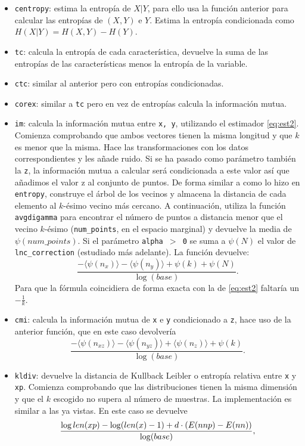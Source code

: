 \documentclass[12pt,a4paper]{report} %
\let\mathbb\relax
\theoremstyle{definition}
\begin{document}
\begin{itemize}
\item \texttt{centropy}: estima la entropía de $X|Y$, para ello usa la función anterior para calcular las entropías de $(X,Y)$ e $Y$. Estima la entropía condicionada como $H(X|Y) = H(X,Y)-H(Y)$.
\item \texttt{tc}: calcula la entropía de cada característica, devuelve la suma de las entropías de las características menos la entropía de la variable.
\item \texttt{ctc}: similar al anterior pero con entropías condicionadas.
\item \texttt{corex}: similar a \texttt{tc} pero en vez de entropías calcula la información mutua.
\item \texttt{im}: calcula la información mutua entre \texttt{x, y}, utilizando el estimador \ref{eq:est2}. Comienza comprobando que ambos vectores tienen la misma longitud y que $k$ es menor que la misma. Hace las transformaciones con los datos correspondientes y les añade ruido. Si se ha pasado como parámetro también la  \texttt{z}, la información mutua a calcular será condicionada a este valor así que añadimos el valor z al conjunto de puntos. De forma similar a como lo hizo en \texttt{entropy}, construye el árbol de los vecinos y almacena la distancia de cada elemento al $k$-ésimo vecino más cercano. A continuación, utiliza la función \texttt{avgdigamma} para encontrar el número de puntos a distancia menor que el vecino $k$-ésimo (\texttt{num\_points}, en el espacio marginal) y devuelve la media de $\psi(num\_points)$. Si el parámetro \texttt{alpha $>$ 0} se suma a $\psi(N)$ el valor de \texttt{lnc\_correction} (estudiado más adelante). La función devuelve:\[
\frac{- \langle \psi(n_x) \rangle - \langle \psi(n_y) \rangle + \psi(k) + \psi(N)}{\log (base)}.
\]
Para que la fórmula coincidiera de forma exacta con la de \ref{eq:est2} faltaría un $-\frac{1}{k}$.
\item \texttt{cmi}: calcula la información mutua de \texttt{x} e \texttt{y} condicionado a \texttt{z}, hace uso de la anterior función, que en este caso devolvería \[
  \frac{- \langle\psi(n_{xz})\rangle - \langle\psi(n_{yz})\rangle + \langle\psi(n_z)\rangle + \psi(k)}{\log(base)}.
\]
\item \texttt{kldiv}: devuelve la distancia de Kullback Leibler o entropía relativa entre \texttt{x} y \texttt{xp}. Comienza comprobando que las distribuciones tienen la misma dimensión y que el $k$ escogido no supera al número de muestras. La implementación es similar a las ya vistas. En este caso se devuelve\[
\frac{\log len(xp) - \log(len(x) -1) + d \cdot (\mathbb{E}( nnp) - \mathbb{E} (nn))}{\log(base)},
\]


\end{itemize}
\end{document}
